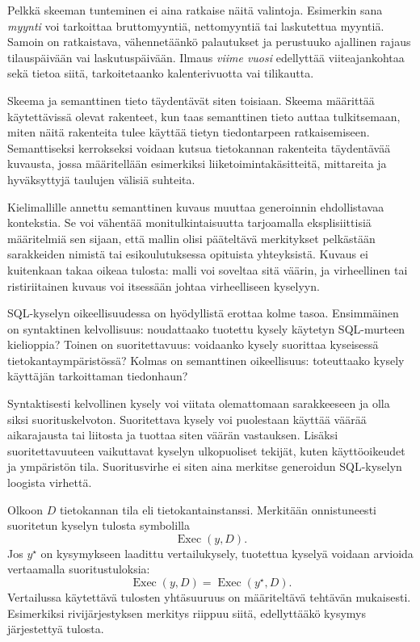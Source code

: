 Pelkkä skeeman tunteminen ei aina ratkaise näitä
valintoja. Esimerkin sana \emph{myynti} voi tarkoittaa
bruttomyyntiä, nettomyyntiä tai laskutettua myyntiä.
Samoin on ratkaistava, vähennetäänkö palautukset ja
perustuuko ajallinen rajaus tilauspäivään vai
laskutuspäivään. Ilmaus \emph{viime vuosi} edellyttää
viiteajankohtaa sekä tietoa siitä, tarkoitetaanko
kalenterivuotta vai tilikautta.

Skeema ja semanttinen tieto täydentävät siten toisiaan.
Skeema määrittää käytettävissä olevat rakenteet,
kun taas semanttinen tieto auttaa tulkitsemaan,
miten näitä rakenteita tulee käyttää tietyn
tiedontarpeen ratkaisemiseen. Semanttiseksi kerrokseksi
voidaan kutsua tietokannan rakenteita täydentävää
kuvausta, jossa määritellään esimerkiksi
liiketoimintakäsitteitä, mittareita ja hyväksyttyjä
taulujen välisiä suhteita.

Kielimallille annettu semanttinen kuvaus muuttaa
generoinnin ehdollistavaa kontekstia. Se voi vähentää
monitulkintaisuutta tarjoamalla eksplisiittisiä
määritelmiä sen sijaan, että mallin olisi pääteltävä
merkitykset pelkästään sarakkeiden nimistä tai
esikoulutuksessa opituista yhteyksistä. Kuvaus ei
kuitenkaan takaa oikeaa tulosta: malli voi soveltaa
sitä väärin, ja virheellinen tai ristiriitainen
kuvaus voi itsessään johtaa virheelliseen kyselyyn.

SQL-kyselyn oikeellisuudessa on hyödyllistä erottaa
kolme tasoa. Ensimmäinen on syntaktinen kelvollisuus:
noudattaako tuotettu kysely käytetyn SQL-murteen
kielioppia? Toinen on suoritettavuus: voidaanko kysely
suorittaa kyseisessä tietokantaympäristössä? Kolmas
on semanttinen oikeellisuus: toteuttaako kysely
käyttäjän tarkoittaman tiedonhaun?

Syntaktisesti kelvollinen kysely voi viitata
olemattomaan sarakkeeseen ja olla siksi
suorituskelvoton. Suoritettava kysely voi puolestaan
käyttää väärää aikarajausta tai liitosta ja tuottaa
siten väärän vastauksen. Lisäksi suoritettavuuteen
vaikuttavat kyselyn ulkopuoliset tekijät, kuten
käyttöoikeudet ja ympäristön tila. Suoritusvirhe
ei siten aina merkitse generoidun SQL-kyselyn
loogista virhettä.

Olkoon \(D\) tietokannan tila eli tietokantainstanssi.
Merkitään onnistuneesti suoritetun kyselyn tulosta
symbolilla
$$
\operatorname{Exec}(y,D).
$$
Jos \(y^{\star}\) on kysymykseen laadittu vertailukysely,
tuotettua kyselyä voidaan arvioida vertaamalla
suoritustuloksia:
$$
\operatorname{Exec}(y,D)
=
\operatorname{Exec}(y^{\star},D).
$$
Vertailussa käytettävä tulosten yhtäsuuruus on
määriteltävä tehtävän mukaisesti. Esimerkiksi
rivijärjestyksen merkitys riippuu siitä,
edellyttääkö kysymys järjestettyä tulosta.

